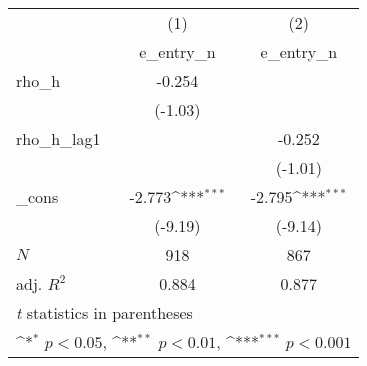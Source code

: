 {
\def\sym#1{\ifmmode^{#1}\else\(^{#1}\)\fi}
\begin{tabular}{l*{2}{c}}
\toprule
            &\multicolumn{1}{c}{(1)}&\multicolumn{1}{c}{(2)}\\
            &\multicolumn{1}{c}{e\_entry\_n}&\multicolumn{1}{c}{e\_entry\_n}\\
\midrule
rho\_h       &      -0.254         &                     \\
            &     (-1.03)         &                     \\
\addlinespace
rho\_h\_lag1  &                     &      -0.252         \\
            &                     &     (-1.01)         \\
\addlinespace
\_cons      &      -2.773\sym{***}&      -2.795\sym{***}\\
            &     (-9.19)         &     (-9.14)         \\
\midrule
\(N\)       &         918         &         867         \\
adj. \(R^{2}\)&       0.884         &       0.877         \\
\bottomrule
\multicolumn{3}{l}{\footnotesize \textit{t} statistics in parentheses}\\
\multicolumn{3}{l}{\footnotesize \sym{*} \(p<0.05\), \sym{**} \(p<0.01\), \sym{***} \(p<0.001\)}\\
\end{tabular}
}
